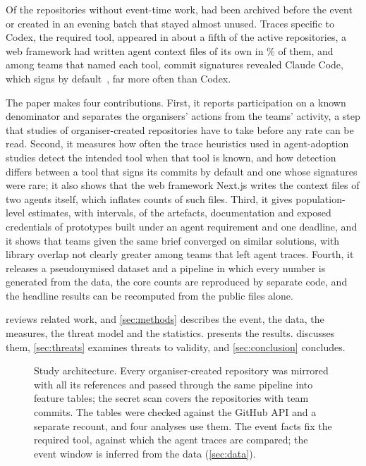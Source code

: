 \documentclass{article}
\begin{document}
Of the \NRqOneInactiveN{} repositories without event-time work, \NRqOneInactiveOrganiserN{} had been archived before the event or created in an evening batch that stayed almost unused. Traces specific to Codex, the required tool, appeared in about a fifth of the active repositories, a web framework had written agent context files of its own in \NRqTwoTracesContextExcludedNextjsPct\% of them, and among teams that named each tool, commit signatures revealed Claude Code, which signs by default~\cite{claudecode2026attribution}, far more often than Codex.

The paper makes four contributions. First, it reports participation on a known denominator and separates the organisers' actions from the teams' activity, a step that studies of organiser-created repositories have to take before any rate can be read. Second, it measures how often the trace heuristics used in agent-adoption studies detect the intended tool when that tool is known, and how detection differs between a tool that signs its commits by default and one whose signatures were rare; it also shows that the web framework Next.js writes the context files of two agents itself, which inflates counts of such files. Third, it gives population-level estimates, with intervals, of the artefacts, documentation and exposed credentials of prototypes built under an agent requirement and one deadline, and it shows that teams given the same brief converged on similar solutions, with library overlap not clearly greater among teams that left agent traces. Fourth, it releases a pseudonymised dataset and a pipeline in which every number is generated from the data, the core counts are reproduced by separate code, and the headline results can be recomputed from the public files alone.

 reviews related work, and \cref{sec:methods} describes the event, the data, the measures, the threat model and the statistics.  presents the results.  discusses them, \cref{sec:threats} examines threats to validity, and \cref{sec:conclusion} concludes.

\begin{figure}[t]
  \centering
  
  \caption{Study architecture. Every organiser-created repository was mirrored with all its references and passed through the same pipeline into feature tables; the secret scan covers the repositories with team commits. The tables were checked against the GitHub API and a separate recount, and four analyses use them. The event facts fix the required tool, against which the agent traces are compared; the event window is inferred from the data (\cref{sec:data}).}
  \label{fig:overview}
\end{figure}
\end{document}
